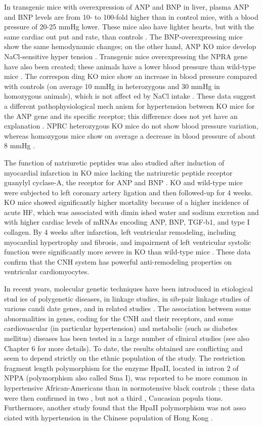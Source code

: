 \documentclass[14pt,a4paper,onecolumn]{extarticle}
\begin{document}
In transgenic mice with overexpression of ANP and BNP in liver, plasma ANP and BNP levels are from 10- to 100-fold higher than in control mice, with a blood pressure of 20-25 mmHg lower. These mice also have lighter hearts, but with the same cardiac out put and rate, than controls \citep{251} \citep{253} \citep{254} \citep{255}. The BNP-overexpressing mice show the same hemodynamic changes; on the other hand, ANP KO mice develop NaCl-sensitive hyper tension \citep{251}. Transgenic mice overexpressing the NPRA gene have also been created; these animals have a lower blood pressure than wild-type mice \citep{251}. The correspon ding KO mice show an increase in blood pressure compared with controls (on average 10 mmHg in heterozygous and 30 mmHg in homozygous animals), which is not affect ed by NaCl intake \citep{254} \citep{255}. These data suggest a different pathophysiological mech anism for hypertension between KO mice for the ANP gene and its specific receptor; this difference does not yet have an explanation \citep{251}. NPRC heterozygous KO mice do not show blood pressure variation, whereas homozygous mice show on average a decrease in blood pressure of about 8 mmHg \citep{251}.

The function of natriuretic peptides was also studied after induction of myocardial infarction in KO mice lacking the natriuretic peptide receptor guanylyl cyclase-A, the receptor for ANP and BNP \citep{89}. KO and wild-type mice were subjected to left coronary artery ligation and then followed-up for 4 weeks. KO mice showed significantly higher mortality because of a higher incidence of acute HF, which was associated with dimin ished water and sodium excretion and with higher cardiac levels of mRNAs encoding ANP, BNP, TGF-b1, and type I collagen. By 4 weeks after infarction, left ventricular remodeling, including myocardial hypertrophy and fibrosis, and impairment of left ventricular systolic function were significantly more severe in KO than wild-type mice \citep{89}. These data confirm that the CNH system has powerful anti-remodeling properties on ventricular cardiomyocytes.

In recent years, molecular genetic techniques have been introduced in etiological stud ies of polygenetic diseases, in linkage studies, in sib-pair linkage studies of various candi date genes, and in related studies \citep{251} \citep{252}. The association between some abnormalities in genes, coding for the CNH and their receptors, and some cardiovascular (in particular hypertension) and metabolic (such as diabetes mellitus) diseases has been tested in a large number of clinical studies (see also Chapter 6 for more details). To date, the results obtained are conflicting and seem to depend strictly on the ethnic population of the study.  The restriction fragment length polymorphism for the enzyme HpaII, located in intron 2 of NPPA (polymorphism also called Sma I), was reported to be more common in hypertensive African-Americans than in normotensive black controls \citep{257}; these data were then confirmed in two \citep{258} \citep{259}, but not a third \citep{260}, Caucasian popula tions. Furthermore, another study found that the HpaII polymorphism was not asso ciated with hypertension in the Chinese population of Hong Kong \citep{261}.
\end{document}
